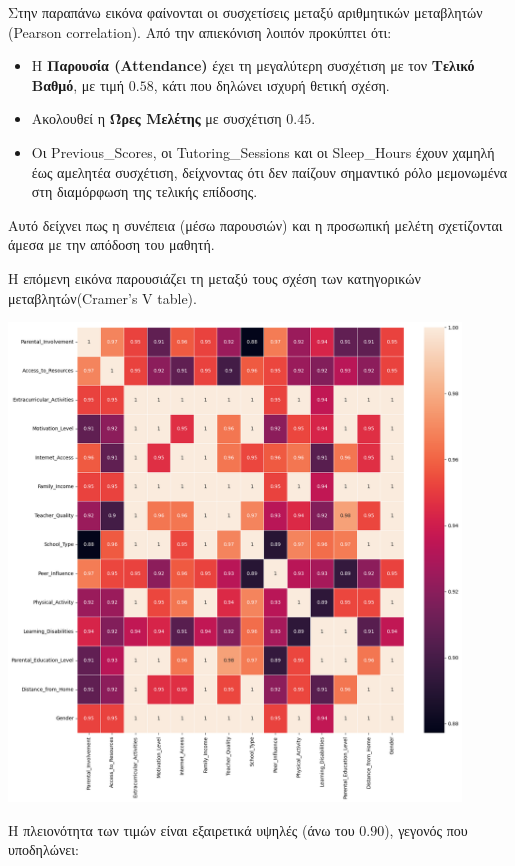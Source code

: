 \documentclass[12pt]{article}
\begin{document}
\noindent Στην παραπάνω εικόνα φαίνονται οι συσχετίσεις μεταξύ αριθμητικών μεταβλητών (Pearson correlation). Από την απιεκόνιση λοιπόν προκύπτει ότι:
\begin{itemize}
    \item Η \textbf{Παρουσία (Attendance)} έχει τη μεγαλύτερη συσχέτιση με τον \textbf{Τελικό Βαθμό}, με τιμή $0.58$, κάτι που δηλώνει ισχυρή θετική σχέση.
    \item Ακολουθεί η \textbf{Ώρες Μελέτης } με συσχέτιση $0.45$.
    \item Οι Previous\_Scores, οι Tutoring\_Sessions και οι Sleep\_Hours έχουν χαμηλή έως αμελητέα συσχέτιση, δείχνοντας ότι δεν παίζουν σημαντικό ρόλο μεμονωμένα στη διαμόρφωση της τελικής επίδοσης.
\end{itemize}

\noindent Αυτό δείχνει πως η συνέπεια (μέσω παρουσιών) και η προσωπική μελέτη σχετίζονται άμεσα με την απόδοση του μαθητή.

\noindent Η επόμενη εικόνα παρουσιάζει τη μεταξύ τους σχέση των κατηγορικών μεταβλητών(Cramer's V table).

\begin{center}
    \includegraphics[width=0.9\textwidth]{./images/categorical_relation.png}
    
\end{center}

\noindent Η πλειονότητα των τιμών είναι εξαιρετικά υψηλές (άνω του $0.90$), γεγονός που υποδηλώνει:
\end{document}
